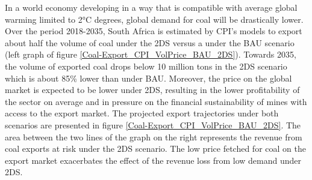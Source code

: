 \documentclass[12pt,english]{article}
\begin{document}
In a world economy developing in a way that is compatible with average global warming limited to 2°C degrees, global demand for coal will be drastically lower. Over the period 2018-2035, South Africa is estimated by CPI's models to export about half the volume of coal under the 2DS versus a under the BAU scenario (left graph of figure \ref{Coal-Export_CPI_VolPrice_BAU_2DS}). %
Towards 2035, the volume of exported coal drops below 10 million tons in the 2DS scenario which is about 85\% lower than under BAU. Moreover, the price on the global market is expected to be lower under 2DS, resulting in the lower profitability of the sector on average and in pressure %
on the financial sustainability of mines with access to the export market. %
The projected export trajectories under both scenarios are presented in figure \ref{Coal-Export_CPI_VolPrice_BAU_2DS}. The area between the two lines of the graph on the right represents the revenue from coal exports at risk under the 2DS scenario. The low price fetched for coal on the export market exacerbates the effect of the revenue loss from low demand under 2DS. 
\end{document}
